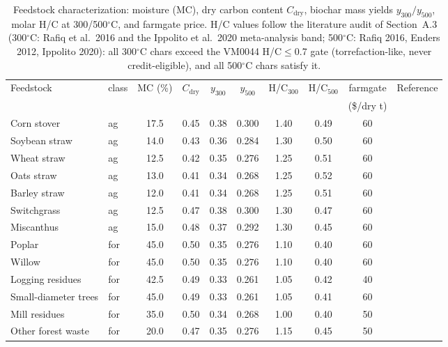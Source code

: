 \begin{table}[htbp]
\centering
\small
\caption{\small Feedstock characterization: moisture (MC), dry carbon content
$C_{\mathrm{dry}}$, biochar mass yields $y_{300}/y_{500}$, molar H/C at
300/500$^\circ$C, and farmgate price. H/C values follow the literature audit of
Section~A.3 (300$^\circ$C: Rafiq et al.\ 2016 and the Ippolito et al.\ 2020
meta-analysis band; 500$^\circ$C: Rafiq 2016, Enders 2012, Ippolito 2020): all
300$^\circ$C chars exceed the VM0044 H/C$\le$0.7 gate (torrefaction-like, never
credit-eligible), and all 500$^\circ$C chars satisfy it.}
\label{tab:s2}
\begin{tabular}{llcccccc cc}
\toprule
Feedstock & class & MC (\%) & $C_{\mathrm{dry}}$ & $y_{300}$ & $y_{500}$ & H/C$_{300}$ & H/C$_{500}$ & farmgate & Reference\\
 & & & & & & & & (\$/dry t) & \\
\midrule
Corn stover & ag & 17.5 & 0.45 & 0.38 & 0.300 & 1.40 & 0.49 & 60 & \cite{rafiq2016,ippolito2020}\\
Soybean straw & ag & 14.0 & 0.43 & 0.36 & 0.284 & 1.30 & 0.50 & 60 & \cite{ippolito2020}\\
Wheat straw & ag & 12.5 & 0.42 & 0.35 & 0.276 & 1.25 & 0.51 & 60 & \cite{ippolito2020}\\
Oats straw & ag & 13.0 & 0.41 & 0.34 & 0.268 & 1.25 & 0.52 & 60 & \cite{ippolito2020}\\
Barley straw & ag & 12.0 & 0.41 & 0.34 & 0.268 & 1.25 & 0.51 & 60 & \cite{ippolito2020}\\
Switchgrass & ag & 12.5 & 0.47 & 0.38 & 0.300 & 1.30 & 0.47 & 60 & \cite{ippolito2020}\\
Miscanthus & ag & 15.0 & 0.48 & 0.37 & 0.292 & 1.30 & 0.45 & 60 & \cite{ippolito2020}\\
Poplar & for & 45.0 & 0.50 & 0.35 & 0.276 & 1.10 & 0.40 & 60 & \cite{woolf2010,enders2012}\\
Willow & for & 45.0 & 0.50 & 0.35 & 0.276 & 1.10 & 0.40 & 60 & \cite{woolf2010,enders2012}\\
Logging residues & for & 42.5 & 0.49 & 0.33 & 0.261 & 1.05 & 0.42 & 40 & \cite{fagernas2010,enders2012}\\
Small-diameter trees & for & 45.0 & 0.49 & 0.33 & 0.261 & 1.05 & 0.41 & 60 & \cite{roberts2010,enders2012}\\
Mill residues & for & 35.0 & 0.50 & 0.34 & 0.268 & 1.00 & 0.40 & 50 & \cite{enders2012}\\
Other forest waste & for & 20.0 & 0.47 & 0.35 & 0.276 & 1.15 & 0.45 & 50 & \cite{ippolito2020}\\
\bottomrule
\end{tabular}
\end{table}

